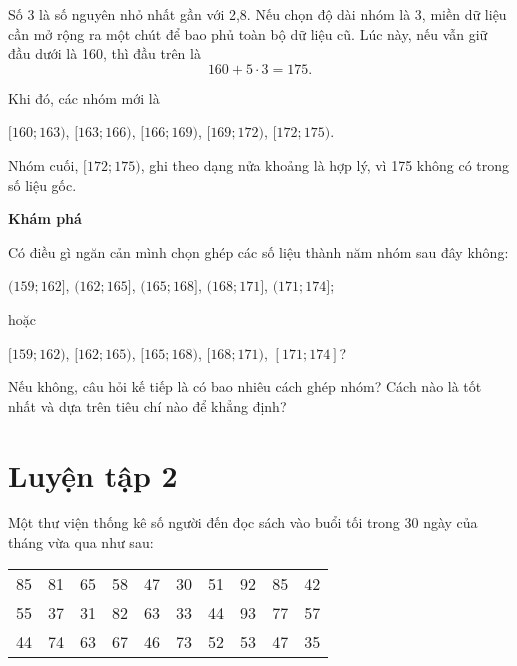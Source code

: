 \documentclass[
  letterpaper,
  DIV=11,
  numbers=noendperiod]{scrartcl}
\begin{document}
Số 3 là số nguyên nhỏ nhất gần với 2,8. Nếu chọn độ dài nhóm là 3, miền
dữ liệu cần mở rộng ra một chút để bao phủ toàn bộ dữ liệu cũ. Lúc này,
nếu vẫn giữ đầu dưới là 160, thì đầu trên là \[
    160+5\cdot 3 = 175.
\]

Khi đó, các nhóm mới là

\([160;163)\), \([163;166)\), \([166;169)\), \([169;172)\),
\([172;175)\).

Nhóm cuối, \([172; 175)\), ghi theo dạng nửa khoảng là hợp lý, vì 175
không có trong số liệu gốc.

\begin{tcolorbox}[enhanced jigsaw, toprule=.15mm, colback=white, bottomrule=.15mm, opacityback=0, leftrule=.75mm, rightrule=.15mm, colframe=quarto-callout-note-color-frame, arc=.35mm, breakable, left=2mm]

\vspace{-3mm}\textbf{Khám phá}\vspace{3mm}

Có điều gì ngăn cản mình chọn ghép các số liệu thành năm nhóm sau đây
không:

\((159;162]\), \((162;165]\), \((165;168]\), \((168;171]\),
\((171;174]\);

hoặc

\([159;162)\), \([162;165)\), \([165;168)\), \([168;171)\),
\([171;174]\)?

Nếu không, câu hỏi kế tiếp là có bao nhiêu cách ghép nhóm? Cách nào là
tốt nhất và dựa trên tiêu chí nào để khẳng định?

\end{tcolorbox}

\section*{Luyện tập 2}

Một thư viện thống kê số người đến đọc sách vào buổi tối trong 30 ngày
của tháng vừa qua như sau:

\begin{table}[!h]
\centering
\begin{tabular}{cccccccccc}
\toprule
85 & 81 & 65 & 58 & 47 & 30 & 51 & 92 & 85 & 42\\
55 & 37 & 31 & 82 & 63 & 33 & 44 & 93 & 77 & 57\\
44 & 74 & 63 & 67 & 46 & 73 & 52 & 53 & 47 & 35\\
\bottomrule
\end{tabular}
\end{table}
\end{document}

